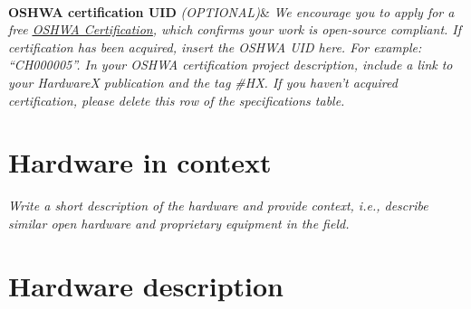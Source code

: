 \documentclass[11pt, letterpaper]{article}
\begin{document}
\begin{flushleft}
\begin{tabu}
  \\
\hline \textbf{OSHWA certification UID} \vskip 0.1cm {\it (OPTIONAL)}&
{\it We encourage you to apply for a free \href{https://certification.oshwa.org/}{\underline{OSHWA Certification}}, which confirms your work is open-source compliant.
\vskip 0.2cm
If certification has been acquired, insert the OSHWA UID here. For example: “CH000005”. In your OSHWA certification project description, include a link to your HardwareX publication and the tag \#HX.
\vskip 0.2cm
If you haven’t acquired certification, please delete this row of the specifications table.}
\\\hline
\end{tabu}
\end{flushleft}


\newpage
\section{Hardware in context}
\textit{Write a short description of the hardware and provide context, i.e., describe similar open hardware and proprietary equipment in the field.}
\section{Hardware description}

\end{document}
